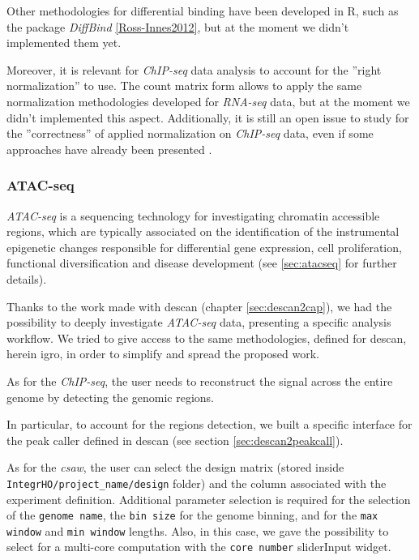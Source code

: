Other methodologies for differential binding have been developed in R, such as the package \textit{DiffBind} \ref{Ross-Innes2012}, but at the moment we didn't implemented them yet.

Moreover, it is relevant for \textit{ChIP-seq} data analysis to account for the ''right normalization'' to use.
The count matrix form allows to apply the same normalization methodologies developed for \textit{RNA-seq} data, but at the moment we didn't implemented this aspect.
Additionally, it is still an open issue to study for the ''correctness'' of applied normalization on \textit{ChIP-seq} data, even if some approaches have already been presented \cite{Angelini2015}.


\subsubsection{ATAC-seq} \label{sec:integrhoatac}

\textit{ATAC-seq} is a sequencing technology for investigating chromatin accessible regions, which are typically associated on the identification of the instrumental epigenetic changes responsible for differential gene expression, cell proliferation, functional diversification and disease development (see \ref{sec:atacseq} for further details).



Thanks to the work made with \gls{descan} (chapter \ref{sec:descan2cap}), we had the possibility to deeply investigate \textit{ATAC-seq} data, presenting a specific analysis workflow.
We tried to give access to the same methodologies, defined for \gls{descan}, herein \gls{igro}, in order to simplify and spread the proposed work.

As for the \textit{ChIP-seq}, the user needs to reconstruct the signal across the entire genome by detecting the genomic regions.

In particular, to account for the regions detection, we built a specific interface for the peak caller defined in \gls{descan} (see section \ref{sec:descan2peakcall}).

As for the \textit{csaw}, the user can select the design matrix (stored inside \lstinline!IntegrHO/project_name/design! folder) and the column associated with the experiment definition.
Additional parameter selection is required for the selection of the \lstinline!genome name!, the \lstinline!bin size! for the genome binning, and for the \lstinline!max window! and \lstinline!min window! lengths.
Also, in this case, we gave the possibility to select for a multi-core computation with the \lstinline!core number! sliderInput widget.

